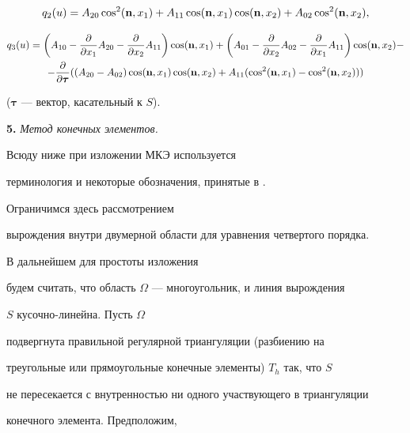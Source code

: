 $$


q_2(u)= A_{20}\cos^2({\bold n},x_1)+A_{11}\cos({\bold n},x_1)


\cos({\bold n},x_2)


+A_{02}\cos^2({\bold n},x_2),


$$


\begin{multline*}


q_3(u)=\bigg(A_{10}-\frac{\partial}{\partial x_1}A_{20}-


\frac{\partial}{\partial x_2}A_{11}\bigg)\cos ({\bold n},x_1)+


\bigg(A_{01}-\frac{\partial}{\partial x_2}A_{02}-


\frac{\partial}{\partial x_1}A_{11}\bigg)\cos ({\bold n},x_2)-\\


%


-\frac{\partial}{\partial \boldsymbol \tau}((A_{20}-A_{02})


\cos ({\bold n},x_1)\cos ({\bold n},x_2)


+A_{11}(\cos ^2({\bold n},x_1)-\cos ^2({\bold n},x_2)))


\end{multline*}


(${\boldsymbol \tau}$ --- вектор, касательный к $S$).


\medskip





{\bf 5.} {\it Метод конечных элементов.}


Всюду ниже при изложении МКЭ используется 


терминология и некоторые обозначения, принятые в \cite{Ciarle}.


Ограничимся здесь рассмотрением


вырождения внутри двумерной области для уравнения четвертого порядка.


В дальнейшем для простоты изложения


будем считать, что область $\Omega$ --- многоугольник, и линия вырождения


$S$ кусочно-линейна. Пусть $\Omega$


подвергнута правильной регулярной триангуляции (разбиению на 


треугольные или прямоугольные конечные элементы) $T_h$ так, что $S$ 


не пересекается с внутренностью ни одного участвующего в триангуляции


конечного элемента. Предположим,


